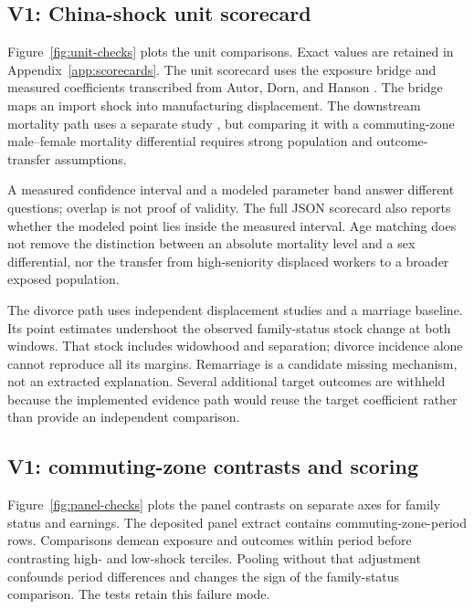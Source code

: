 \documentclass[10pt]{article}
\begin{document}
\subsection{V1: China-shock unit scorecard}
Figure~\ref{fig:unit-checks} plots the unit comparisons. Exact values are
retained in Appendix~\ref{app:scorecards}.
The unit scorecard uses the exposure bridge and measured coefficients
transcribed from Autor, Dorn, and Hanson \cite{autor2019}. The bridge
maps an import shock into manufacturing displacement. The downstream
mortality path uses a separate study \cite{sullivan2009}, but comparing
it with a commuting-zone male--female mortality differential requires
strong population and outcome-transfer assumptions.





A measured
confidence interval and a modeled parameter band answer different
questions; overlap is not proof of validity. The full JSON scorecard
also reports whether the modeled point lies inside the measured interval.
Age matching does not remove the distinction between an absolute
mortality level and a sex differential, nor the transfer from
high-seniority displaced workers to a broader exposed population.




The divorce path uses independent displacement studies
\cite{rege2007,charles2004} and a marriage baseline. Its point estimates
undershoot the observed family-status stock change at both windows.
That stock includes widowhood and separation; divorce incidence alone
cannot reproduce all its margins. Remarriage is a candidate missing
mechanism, not an extracted explanation. Several additional target
outcomes are withheld because the implemented evidence path would reuse
the target coefficient rather than provide an independent comparison.

\subsection{V1: commuting-zone contrasts and scoring}
Figure~\ref{fig:panel-checks} plots the panel contrasts on separate axes
for family status and earnings.
The deposited panel extract contains \PanelCount{} commuting-zone-period
rows. Comparisons demean exposure and outcomes within period before
contrasting high- and low-shock terciles. Pooling without that adjustment
confounds period differences and changes the sign of the family-status
comparison. The tests retain this failure mode.
\end{document}
